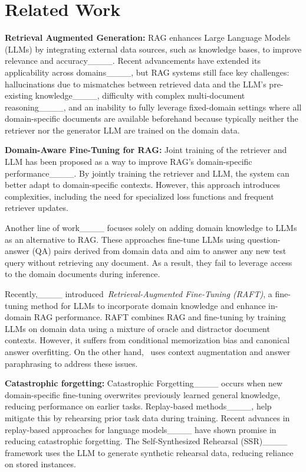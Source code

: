 \section{Related Work}
\label{sec:related}

\noindent\textbf{Retrieval Augmented Generation:} RAG enhances Large Language Models (LLMs) by integrating external data sources, such as knowledge bases, to improve relevance and accuracy____. Recent advancements have extended its applicability across domains____, but RAG systems still face key challenges: hallucinations due to mismatches between retrieved data and the LLM’s pre-existing knowledge____, difficulty with complex multi-document reasoning____, and an inability to fully leverage fixed-domain settings where all domain-specific documents are available beforehand because typically neither the retriever nor the generator LLM are trained on the domain data.

\noindent\textbf{Domain-Aware Fine-Tuning for RAG:} Joint training of the retriever and LLM has been proposed as a way to improve RAG’s domain-specific performance____. By jointly training the retriever and LLM, the system can better adapt to domain-specific contexts. However, this approach introduces complexities, including the need for specialized loss functions and frequent retriever updates. 

Another line of work____ focuses solely on adding domain knowledge to LLMs as an alternative to RAG.
These approaches fine-tune LLMs using question-answer (QA) pairs derived from domain data and aim to answer any new test query without retrieving any document. As a result, they fail to leverage access to the domain documents during inference.

Recently,____ introduced~\textit{Retrieval-Augmented Fine-Tuning (RAFT)}, a fine-tuning method for LLMs to incorporate domain knowledge and enhance in-domain RAG performance. 
RAFT combines RAG and fine-tuning by training LLMs on domain data using a mixture of oracle and distractor document contexts.
However, it suffers from conditional memorization bias and canonical answer overfitting. 
On the other hand, \ourmethodshort\ uses context augmentation and answer paraphrasing to address these issues.

\noindent\textbf{Catastrophic forgetting:}
Catastrophic Forgetting____ occurs when new domain-specific fine-tuning overwrites previously learned general knowledge, reducing performance on earlier tasks. Replay-based methods____, help mitigate this by rehearsing prior task data during training. Recent advances in replay-based approaches for language models____ have shown promise in reducing catastrophic forgetting. The Self-Synthesized Rehearsal (SSR)____ framework uses the LLM to generate synthetic rehearsal data, reducing reliance on stored instances.